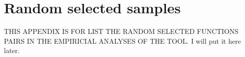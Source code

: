 \chapter{Random selected samples}

THIS APPENDIX IS FOR LIST THE RANDOM SELECTED FUNCTIONS PAIRS IN THE 
EMPIRICIAL ANALYSES OF THE TOOL. I will put it here later.
